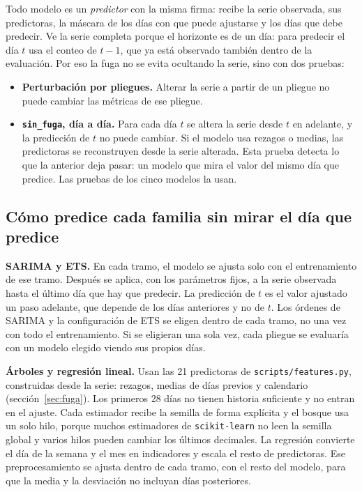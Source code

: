 Todo modelo es un \emph{predictor} con la misma firma: recibe la serie observada, sus predictoras, la máscara de los días con que puede ajustarse y los días que debe predecir. Ve la serie completa porque el horizonte es de un día: para predecir el día $t$ usa el conteo de $t-1$, que ya está observado también dentro de la evaluación. Por eso la fuga no se evita ocultando la serie, sino con dos pruebas:
\begin{itemize}
  \item \textbf{Perturbación por pliegues.} Alterar la serie a partir de un pliegue no puede cambiar las métricas de ese pliegue.
  \item \textbf{\texttt{sin\_fuga}, día a día.} Para cada día $t$ se altera la serie desde $t$ en adelante, y la predicción de $t$ no puede cambiar. Si el modelo usa rezagos o medias, las predictoras se reconstruyen desde la serie alterada. Esta prueba detecta lo que la anterior deja pasar: un modelo que mira el valor del mismo día que predice. Las pruebas de los cinco modelos la usan.
\end{itemize}

\subsection{Cómo predice cada familia sin mirar el día que predice}\label{sec:imp-modelos}

\textbf{SARIMA y ETS.} En cada tramo, el modelo se ajusta solo con el entrenamiento de ese tramo. Después se aplica, con los parámetros fijos, a la serie observada hasta el último día que hay que predecir. La predicción de $t$ es el valor ajustado un paso adelante, que depende de los días anteriores y no de $t$. Los órdenes de SARIMA y la configuración de ETS se eligen dentro de cada tramo, no una vez con todo el entrenamiento. Si se eligieran una sola vez, cada pliegue se evaluaría con un modelo elegido viendo sus propios días.

\textbf{Árboles y regresión lineal.} Usan las 21 predictoras de \texttt{scripts/\allowbreak{}features.py}, construidas desde la serie: rezagos, medias de días previos y calendario (sección~\ref{sec:fuga}). Los primeros 28 días no tienen historia suficiente y no entran en el ajuste. Cada estimador recibe la semilla de forma explícita y el bosque usa un solo hilo, porque muchos estimadores de \texttt{scikit-learn} no leen la semilla global y varios hilos pueden cambiar los últimos decimales. La regresión convierte el día de la semana y el mes en indicadores y escala el resto de predictoras. Ese preprocesamiento se ajusta dentro de cada tramo, con el resto del modelo, para que la media y la desviación no incluyan días posteriores.

